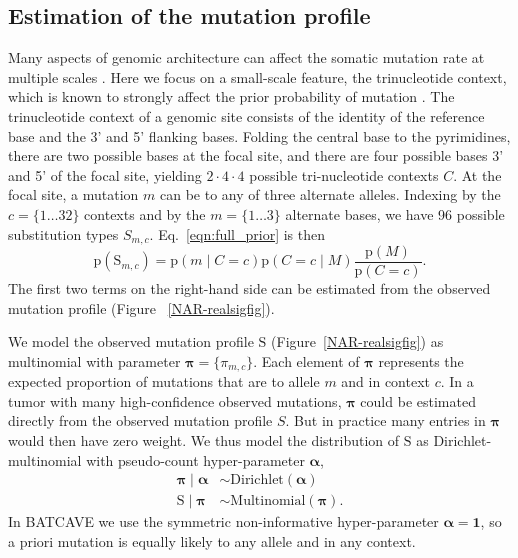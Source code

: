 \documentclass[a4,center,fleqn]{NAR}
\newcommand{\batcave}{BATCAVE\xspace}
\begin{document}
\subsection{Estimation of the mutation profile}
Many aspects of genomic architecture can affect the somatic mutation rate at multiple scales \cite{Buisson2019}.
Here we focus on a small-scale feature, the trinucleotide context, which is known to strongly affect the prior probability of mutation \citep{Nik-Zainal2012a,Alexandrov2015,Lee-Six2018}.
The trinucleotide context of a genomic site consists of the identity of the reference base and the 3' and 5' flanking bases.
Folding the central base to the pyrimidines, there are two possible bases at the focal site, and there are four possible bases 3' and 5' of the focal site, yielding $2 \cdot 4 \cdot 4$ possible tri-nucleotide contexts $C$.
At the focal site, a mutation $m$ can be to any of three alternate alleles.
Indexing by the $c=\{1 \dots 32\}$ contexts and by the $m = \{1 \dots 3\}$ alternate bases, we have 96 possible substitution types $S_{m,c}$.
Eq.~\ref{eqn:full_prior} is then
\begin{equation}
  \label{eqn:detailed_prior}
  \mathrm{p}(\mathrm{S}_{m,c}) = \mathrm{p}(m \mid C = c) \mathrm{p}(C = c \mid M)\frac{\mathrm{p}(M)}{\mathrm{p}(C = c)}.
\end{equation}
The first two terms on the right-hand side can be estimated from the observed mutation profile (Figure ~\ref{NAR-realsigfig}).

We model the observed mutation profile $\mathrm{S}$ (Figure~\ref{NAR-realsigfig}) as multinomial with parameter $\boldsymbol{\pi} = \{\pi_{m,c}\}$.
Each element of $\boldsymbol{\pi}$ represents the expected proportion of mutations that are to allele $m$ and in context $c$.
In a tumor with many high-confidence observed mutations, $\boldsymbol{\pi}$ could be estimated directly from the observed mutation profile $S$.
But in practice many entries in $\boldsymbol{\pi}$ would then have zero weight.
We thus model the distribution of $\mathrm{S}$ as Dirichlet-multinomial with pseudo-count hyper-parameter $\boldsymbol{\alpha}$, 
\begin{equation}
\begin{aligned}
  \boldsymbol{\pi} \mid \boldsymbol{\alpha} &\sim \textrm{Dirichlet}(\boldsymbol{\alpha}) \\
  \mathrm{S} \mid \boldsymbol{\pi} & \sim \textrm{Multinomial}(\boldsymbol{\pi}).
\end{aligned}
\end{equation}
In \batcave we use the symmetric non-informative hyper-parameter $\boldsymbol{\alpha} = \boldsymbol{1}$, so a priori mutation is equally likely to any allele and in any context.
\end{document}
